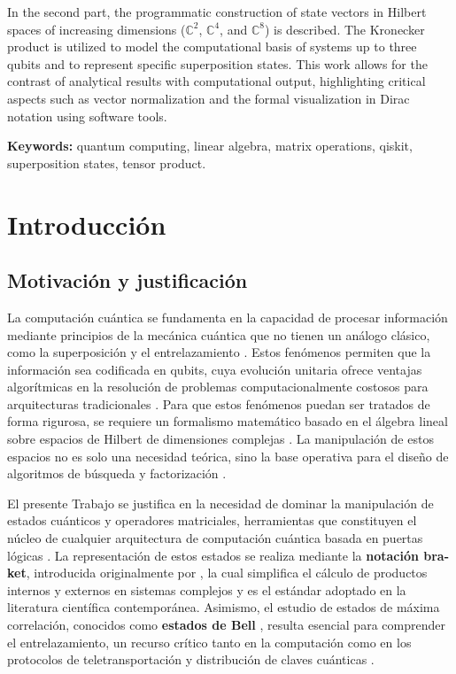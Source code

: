 \documentclass[11pt,a4paper,spanish]{book}
\begin{document}
In the second part, the programmatic construction of state vectors in Hilbert spaces of increasing dimensions ($\mathbb{C}^2$, $\mathbb{C}^4$, and $\mathbb{C}^8$) is described. The Kronecker product is utilized to model the computational basis of systems up to three qubits and to represent specific superposition states. This work allows for the contrast of analytical results with computational output, highlighting critical aspects such as vector normalization and the formal visualization in Dirac notation using software tools.

\vspace{0.5cm}
{\bf Keywords:} quantum computing, linear algebra, matrix operations, qiskit, superposition states, tensor product.

\mainmatter

\chapter{Introducción}

\section{Motivación y justificación}
La computación cuántica se fundamenta en la capacidad de procesar información mediante principios de la mecánica cuántica que no tienen un análogo clásico, como la superposición y el entrelazamiento \citep{feynman1982, nielsen2010}. Estos fenómenos permiten que la información sea codificada en qubits, cuya evolución unitaria ofrece ventajas algorítmicas en la resolución de problemas computacionalmente costosos para arquitecturas tradicionales \citep{deutsch1985}. Para que estos fenómenos puedan ser tratados de forma rigurosa, se requiere un formalismo matemático basado en el álgebra lineal sobre espacios de Hilbert de dimensiones complejas \citep{nielsen2010}. La manipulación de estos espacios no es solo una necesidad teórica, sino la base operativa para el diseño de algoritmos de búsqueda y factorización \citep{shor1994}.

El presente Trabajo se justifica en la necesidad de dominar la manipulación de estados cuánticos y operadores matriciales, herramientas que constituyen el núcleo de cualquier arquitectura de computación cuántica basada en puertas lógicas \citep{deutsch1985}. La representación de estos estados se realiza mediante la \textbf{notación bra-ket}, introducida originalmente por \cite{dirac1939}, la cual simplifica el cálculo de productos internos y externos en sistemas complejos y es el estándar adoptado en la literatura científica contemporánea. Asimismo, el estudio de estados de máxima correlación, conocidos como \textbf{estados de Bell} \citep{bell1964}, resulta esencial para comprender el entrelazamiento, un recurso crítico tanto en la computación como en los protocolos de teletransportación y distribución de claves cuánticas \citep{bennett1993}.
\end{document}
